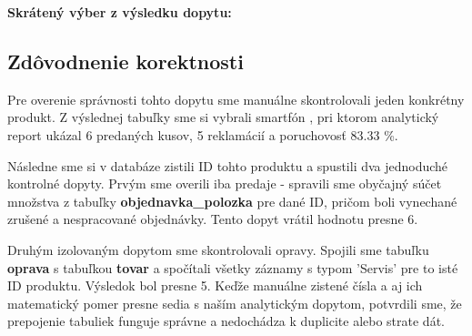 \documentclass[11pt, a4paper]{article}
\begin{document}
\vspace{1em}
\noindent\textbf{Skrátený výber z výsledku dopytu:}

\begin{table}[H]
\centering
{}
\end{table}

\subsection{Zdôvodnenie korektnosti}

Pre overenie správnosti tohto dopytu sme manuálne skontrolovali jeden konkrétny produkt. Z výslednej tabuľky sme si vybrali smartfón , pri ktorom analytický report ukázal 6 predaných kusov, 5 reklamácií a poruchovosť 83.33 \%.

Následne sme si v databáze zistili ID tohto produktu a spustili dva jednoduché kontrolné dopyty. Prvým sme overili iba predaje - spravili sme obyčajný súčet množstva z tabuľky \textbf{objednavka\_polozka} pre dané ID, pričom boli vynechané zrušené a nespracované objednávky. Tento dopyt vrátil hodnotu presne 6.

Druhým izolovaným dopytom sme skontrolovali opravy. Spojili sme tabuľku \textbf{oprava} s tabuľkou \textbf{tovar} a spočítali všetky záznamy s typom 'Servis' pre to isté ID produktu. Výsledok bol presne 5. Keďže manuálne zistené čísla a aj ich matematický pomer presne sedia s naším analytickým dopytom, potvrdili sme, že prepojenie tabuliek funguje správne a nedochádza k duplicite alebo strate dát.
\end{document}
